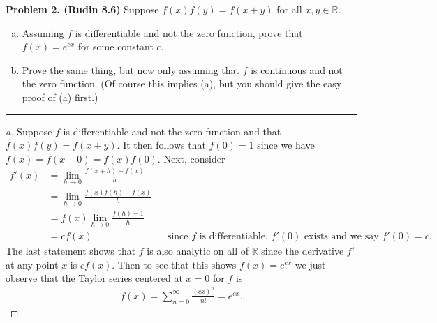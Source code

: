 \documentclass[leqno]{article}
\theoremstyle{nonumberplain}
\newtheorem{proof}{Proof}
\newcommand{\R}{\mathbb{R}}
\begin{document}
\pagebreak



\noindent\textbf{Problem 2. (Rudin 8.6)} Suppose $f(x)f(y)=f(x+y)$ for all $x,y\in \R$.
\begin{enumerate}[(a)]
\item Assuming $f$ is differentiable and not the zero function, prove that $f(x)=e^{cx}$ for some constant $c$.
\item Prove the same thing, but now only assuming that $f$ is continuous and not the zero function. (Of course this implies (a), but you should give the easy proof of (a) first.)
\end{enumerate}

\noindent\rule[0.5ex]{\linewidth}{1pt}

\begin{proof}[a]
Suppose $f$ is differentiable and not the zero function and that $f(x)f(y)=f(x+y)$.  It then follows that $f(0)=1$ since we have $f(x)=f(x+0)=f(x)f(0)$.  Next, consider
\begin{align*}
f'(x)&=\lim_{h\to 0} \frac{f(x+h)-f(x)}{h}\\
&= \lim_{h\to 0} \frac{f(x)f(h)-f(x)}{h}\\
&= f(x) \lim_{h\to 0} \frac{f(h)-1}{h}\\
&= cf(x) &&\textrm{since $f$ is differentiable, $f'(0)$ exists and we say $f'(0)=c$.}
\end{align*}
The last statement shows that $f$ is also analytic on all of $\R$ since the derivative $f'$ at any point $x$ is $cf(x)$. Then to see that this shows $f(x)=e^{cx}$ we just observe that the Taylor series centered at $x=0$ for $f$ is
\begin{align*}
f(x)=\sum_{n=0}^\infty \frac{(cx)^n}{n!}=e^{cx}.
\end{align*}

\end{proof}
\end{document}
